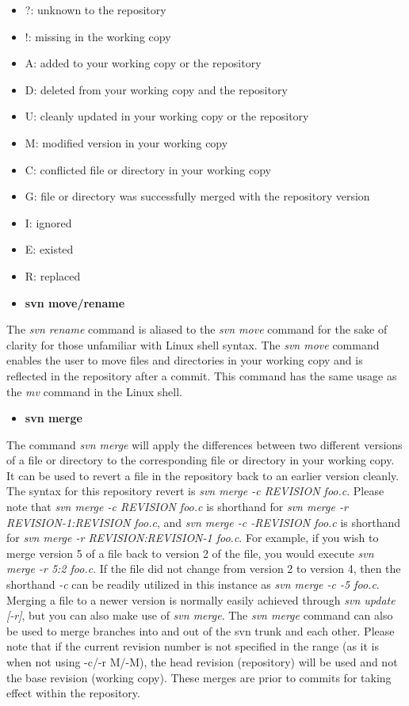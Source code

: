 \documentclass[12pt,letterpaper]{article}
\begin{document}
\begin{itemize}
\item ?: unknown to the repository
\item !: missing in the working copy
\item A: added to your working copy or the repository
\item D: deleted from your working copy and the repository
\item U: cleanly updated in your working copy or the repository
\item M: modified version in your working copy
\item C: conflicted file or directory in your working copy
\item G: file or directory was successfully merged with the repository version
\item I: ignored
\item E: existed
\item R: replaced
\end{itemize}

\begin{itemize}
\item \textbf{svn move/rename}
\end{itemize}

The \emph{svn rename} command is aliased to the \emph{svn move} command for the sake of clarity for those unfamiliar with Linux shell syntax.  The \emph{svn move} command enables the user to move files and directories in your working copy and is reflected in the repository after a commit.  This command has the same usage as the \emph{mv} command in the Linux shell.

\begin{itemize}
\item \textbf{svn merge}
\end{itemize}

The command \emph{svn merge} will apply the differences between two different versions of a file or directory to the corresponding file or directory in your working copy.  It can be used to revert a file in the repository back to an earlier version cleanly.  The syntax for this repository revert is \emph{svn merge -c REVISION foo.c}.  Please note that \emph{svn merge -c REVISION foo.c} is shorthand for \emph{svn merge -r REVISION-1:REVISION foo.c}, and \emph{svn merge -c -REVISION foo.c} is shorthand for \emph{svn merge -r REVISION:REVISION-1 foo.c}.  For example, if you wish to merge version 5 of a file back to version 2 of the file, you would execute \emph{svn merge -r 5:2 foo.c}.  If the file did not change from version 2 to version 4, then the shorthand \emph{-c} can be readily utilized in this instance as \emph{svn merge -c -5 foo.c}.  Merging a file to a newer version is normally easily achieved through \emph{svn update [-r]}, but you can also make use of \emph{svn merge}.  The \emph{svn merge} command can also be used to merge branches into and out of the svn trunk and each other.  Please note that if the current revision number is not specified in the range (as it is when not using -c/-r M/-M), the head revision (repository) will be used and not the base revision (working copy).  These merges are prior to commits for taking effect within the repository.
\end{document}
